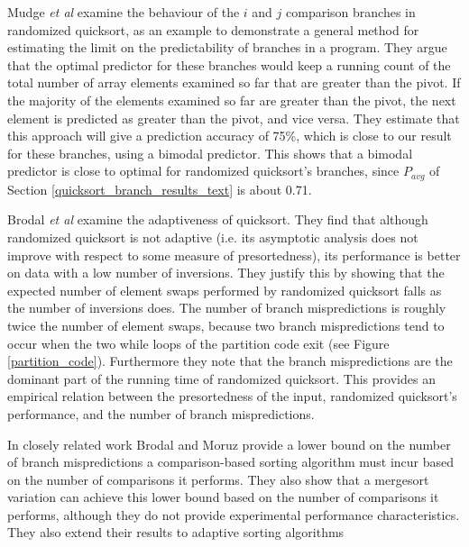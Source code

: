 \documentclass[acmtocl]{acmtrans2m}
\newcommand{\comment}[1]{}
\begin{document}
\comment{ In preliminary experiments, we found that Sanders and Winkel's work is
difficult to reproduce on a Pentium 4 based machine. The only predicated
instruction supported on the Pentium 4 is the conditional move instruction. We
found that rewriting quicksort's loops so that they are suitable for predication
reduces their efficiency and also increases the number of simultaneously live
variables.  Since the Pentium 4 has only eight general purpose registers the
number of simultaneously live variables exceeded the number of available
registers, reducing efficiency. In addition, we also discovered that on the
Pentium 4 conditional moves are surprisingly expensive.  } Mudge \textit{et al}
\citeyear{Mudge+96} examine the behaviour of the $i$ and $j$ comparison branches
in randomized quicksort, as an example to demonstrate a general method for
estimating the limit on the predictability of branches in a program. They argue
that the optimal predictor for these branches would keep a running count of the
total number of array elements examined so far that are greater than the pivot.
If the majority of the elements examined so far are greater than the pivot, the
next element is predicted as greater than the pivot, and vice versa. They
estimate that this approach will give a prediction accuracy of 75\%, which is
close to our result for these branches, using a bimodal predictor.  This shows
that a bimodal predictor is close to optimal for randomized quicksort's
branches, since $P_{avg}$ of Section \ref{quicksort_branch_results_text} is
about 0.71.

Brodal \textit{et al} \citeyear{Brodal+05} examine the adaptiveness of
quicksort.  They find that although randomized quicksort is not adaptive (i.e.
its asymptotic analysis does not improve with respect to some measure of
presortedness), its performance is better on data with a low number of
inversions. They justify this by showing that the expected number of element
swaps performed by randomized quicksort falls as the number of inversions does.
The number of branch mispredictions is roughly twice the number of element
swaps, because two branch mispredictions tend to occur when the two while loops
of the partition code exit (see Figure \ref{partition_code}).  Furthermore they
note that the branch mispredictions are the dominant part of the running time of
randomized quicksort. This provides an empirical relation between the
presortedness of the input, randomized quicksort's performance, and the number
of branch mispredictions. 

In closely related work Brodal and Moruz \citeyear{BrodalMoruz05} provide a
lower bound on the number of branch mispredictions a comparison-based sorting
algorithm must incur based on the number of comparisons it performs. They also
show that a mergesort variation can achieve this lower bound based on the number
of comparisons it performs, although they do not provide experimental
performance characteristics. They also extend their results to adaptive sorting
algorithms
\end{document}
